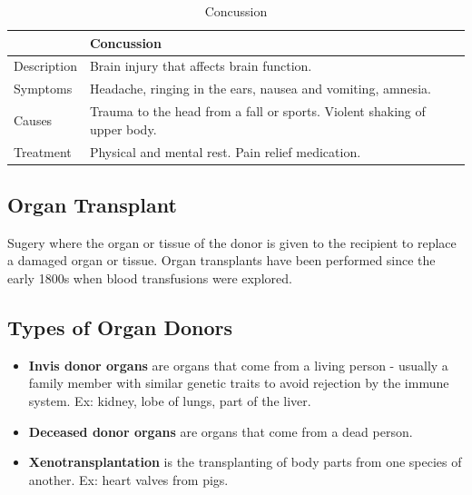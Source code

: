 \documentclass[12pt]{report}
\begin{document}
\begin{table}[h!]
    \renewcommand{\arraystretch}{1.5}
    \setlength{\tabcolsep}{10pt}
    \setlength{\arrayrulewidth}{0.25mm}

    \begin{center}
        \vspace{0.5em}
        \begin{tabular}{|l|l|}
        \hline
         & Concussion \\ 
        \hline
         Description & Brain injury that affects brain function. \\
        \hline
         Symptoms & Headache, ringing in the ears, nausea and vomiting, amnesia.\\ 
         \hline 
         Causes & Trauma to the head from a fall or sports. Violent shaking of upper body.\\ 
         \hline 
         Treatment & Physical and mental rest. Pain relief medication.\\ 
         \hline
        \end{tabular}
    \end{center}
    \caption{Concussion}
\end{table}

\subsection{Organ Transplant}
\begin{definition}
    Sugery where the organ or tissue of the donor is given to the recipient to replace a damaged organ or tissue. Organ transplants have been performed since the early 1800s when blood transfusions were explored.
\end{definition}

\subsection{Types of Organ Donors}
\begin{definition}
    \invis 
    \begin{itemize}
        \item{ \textbf{Invis donor organs} are organs that come from a living person - usually a family member with similar genetic traits to avoid rejection by the immune system. Ex: kidney, lobe of lungs, part of the liver.}
        \item{ \textbf{Deceased donor organs} are organs that come from a dead person.}
        \item{ \textbf{Xenotransplantation} is the transplanting of body parts from one species of another. Ex: heart valves from pigs.}
    \end{itemize}
\end{definition}
\end{document}
